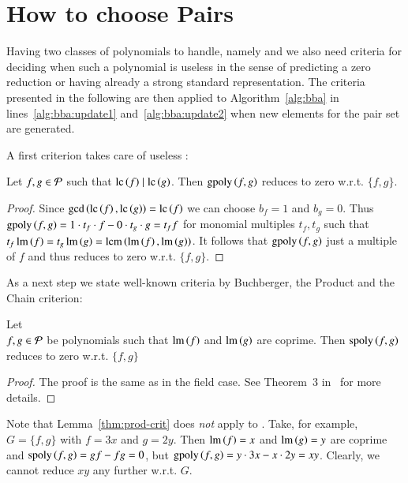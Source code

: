\section{How to choose Pairs}
\label{sec:pairs}
Having two classes of polynomials to handle, namely \spts and \gpts we also need
criteria for deciding when such a polynomial is useless in the sense of
predicting a zero reduction or having already a strong standard representation.
The criteria presented in the following are then applied to
Algorithm~\ref{alg:bba} in lines~\ref{alg:bba:update1} and~\ref{alg:bba:update2}
when new elements for the pair set are generated.

A first criterion takes care of useless \gpts:

\begin{lemma}
Let $f,g \in \mathcal{P}$ such that $\mathrm{lc}\left({f}\right) \mid \mathrm{lc}\left({g}\right)$. Then $\mathrm{gpoly}\left({f},{g}\right)$ reduces
to zero w.r.t. $\{f,g\}$.
\label{crit:gpoly-easy}
\end{lemma}

\begin{proof}
Since $\gcd\left(\mathrm{lc}\left({f}\right), \mathrm{lc}\left({g}\right)\right) = \mathrm{lc}\left({f}\right)$ we can choose $b_f = 1$ and $b_g
=0$. Thus $\mathrm{gpoly}\left({f},{g}\right) = 1 \cdot t_f \cdot f - 0 \cdot t_g \cdot g = t_f f$ for monomial
multiples $t_f, t_g$ such that $t_f \operatorname{lm}\left({f}\right) = t_g \operatorname{lm}\left({g}\right) = \operatorname{lcm}\left(\operatorname{lm}\left({f}\right), \operatorname{lm}\left({g}\right)\right)$. It follows that $\mathrm{gpoly}\left({f},{g}\right)$ just a multiple of $f$ and
thus reduces to zero w.r.t. $\{f,g\}$.
\end{proof}

As a next step we state well-known criteria by Buchberger, the Product and the
Chain criterion:

\begin{lemma}
Let\\
$f,g \in \mathcal{P}$ be polynomials such that $\operatorname{lm}\left({f}\right)$ and $\operatorname{lm}\left({g}\right)$ are coprime.
Then $\mathrm{spoly}\left({f},{g}\right)$ reduces to zero w.r.t. $\{f,g\}$
\label{thm:prod-crit}
\end{lemma}

\begin{proof}
The proof is the same as in the field case.
See Theorem~3 in~\cite{lichtblau2012} for more details.
\end{proof}

Note that Lemma~\ref{thm:prod-crit} does \emph{not} apply to \gpts. Take, for
example, $G=\{f,g\}$ with $f=3x$ and $g=2y$. Then $\operatorname{lm}\left({f}\right) = x$ and $\operatorname{lm}\left({g}\right) = y$
are coprime and $\mathrm{spoly}\left({f},{g}\right) = g f - fg = 0$, but $\mathrm{gpoly}\left({f},{g}\right) = y \cdot 3x - x
\cdot 2y = xy$. Clearly, we cannot reduce $xy$ any further w.r.t. $G$.

